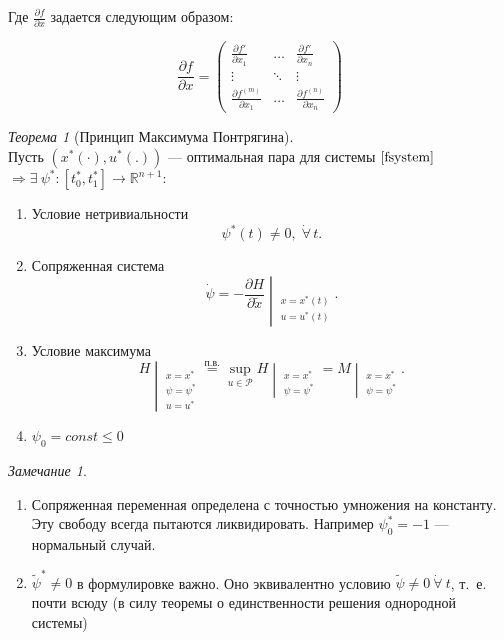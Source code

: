 \documentclass[oneside, final, 14pt, draft]{article}
\theoremstyle{definition}
\theoremstyle{definition}
\theoremstyle{remark}
\newtheorem{rmk}{Замечание}[section]
\theoremstyle{theorem}
\newtheorem{thm}{Теорема}[section]
\renewcommand{\leq}{\leqslant}
\begin{document}
Где $\frac{\partial f}{\partial x}$ задается следующим образом:

$$\frac{\partial f}{\partial x} =
  \begin{pmatrix}
        \frac{\partial f'}{\partial x_1} & \dots & \frac{\partial f'}{\partial x_n} \\
        \vdots & \ddots & \vdots \\
        \frac{\partial f^{(m)}}{\partial x_1} & \dots & \frac{\partial f^{(n)}}{\partial x_n}
  \end{pmatrix}$$

\begin{thm}[Принцип Максимума Понтрягина] \ \\
    Пусть $\left( x^*(\cdot), u^*(.)\right)$ --- оптимальная пара для системы $\eqref{fsystem}$ $\Rightarrow \exists\:\psi^*\colon\left[t_0^*, t_1^*\right]\rightarrow \mathbb{R}^{n+1}\colon$
    \begin{enumerate}
    \item Условие нетривиальности $$\psi^*(t) \neq 0,\;\dot\forall\,t.$$ 
    \item Сопряженная система
    \begin{equation*}
    \dot{\psi} = \left.-\frac{\partial H}{\partial \widetilde{x}}\middle|_{\substack{x = x^*(t) \\ u = u^*(t)}}\right. .
    \end{equation*}
    \item Условие максимума
    \begin{equation*}
    \left. H \middle |_{\substack{x = x^* \\ \psi = \psi^* \\ u = u^*}}\right. \stackrel{\text{п.в.}}{=}
    \sup\limits_{u \in \mathcal{P}} \left.H\middle|_{\substack{x = x^* \\ \psi = \psi^*}}\right. =
    \left. M \middle |_{\substack{x = x^* \\ \psi = \psi^*}}\right. .
    \end{equation*}
    \item $\psi_0 = const \leq 0$
    \end{enumerate}
\end{thm}

\begin{rmk}
\ \\
\begin{enumerate}
    \item
    Сопряженная переменная определена с точностью умножения на константу. Эту свободу всегда пытаются ликвидировать. Например $\psi_0^* = -1$ --- нормальный случай.\\
    \item $\widetilde{\psi}^* \neq 0$ в формулировке важно. Оно эквивалентно условию $\widetilde{\psi} \neq 0\ \dot \forall\ t$, т.~е. почти всюду (в силу теоремы о единственности решения однородной системы)
\end{enumerate}
\end{rmk}
\end{document}
